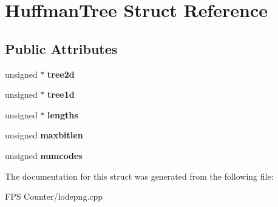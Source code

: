 \hypertarget{struct_huffman_tree}{}\section{Huffman\+Tree Struct Reference}
\label{struct_huffman_tree}
\subsection*{Public Attributes}
\begin{DoxyCompactItemize}
\item 
\mbox{\label{struct_huffman_tree_a91160304cb771d2f9f39ee357c9b05a8}} 
unsigned $\ast$ {\bfseries tree2d}
\item 
\mbox{\label{struct_huffman_tree_a47b3346a25fe0a3222b595c236ad146e}} 
unsigned $\ast$ {\bfseries tree1d}
\item 
\mbox{\label{struct_huffman_tree_aef81d45a5c56276c5699a8e9a575021d}} 
unsigned $\ast$ {\bfseries lengths}
\item 
\mbox{\label{struct_huffman_tree_adf034ca9ce62a4ebfffaaeaba4378a26}} 
unsigned {\bfseries maxbitlen}
\item 
\mbox{\label{struct_huffman_tree_a608df5a24f60d1077a5cde19d5149e1f}} 
unsigned {\bfseries numcodes}
\end{DoxyCompactItemize}


The documentation for this struct was generated from the following file\+:\begin{DoxyCompactItemize}
\item 
F\+P\+S Counter/lodepng.\+cpp\end{DoxyCompactItemize}

